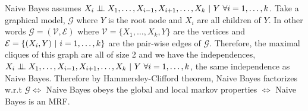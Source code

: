 \tftrue 

Naive Bayes assumes $X_i \perp\!\!\!\perp X_1, \dots, X_{i-1}, X_{i+1}, \dots, X_k ~\vert~ Y ~\forall i = 1, \dots, k$. Take a graphical model, $\mathcal{G}$ where $Y$ is the root node and $X_i$ are all children of $Y$. In other words $\mathcal{G} = (\mathcal{V}, \mathcal{E})$ where $\mathcal{V} = \{ X_1, \dots, X_k, Y \}$ are the vertices and $\mathcal{E} = \{ (X_i, Y) ~\vert~  i = 1, \dots, k \}$ are the pair-wise edges of $\mathcal{G}$. Therefore, the maximal cliques of this graph are all of size 2 and we have the independences, $X_i \perp\!\!\!\perp X_1, \dots, X_{i-1}, X_{i+1}, \dots, X_k ~\vert~ Y ~\forall i = 1, \dots, k$, the same independence as Naive Bayes. Therefore by Hammersley-Clifford theorem, Naive Bayes factorizes w.r.t $\mathcal{G} \iff$ Naive Bayes obeys the global and local markov properties $\iff$ Naive Bayes is an MRF. 

